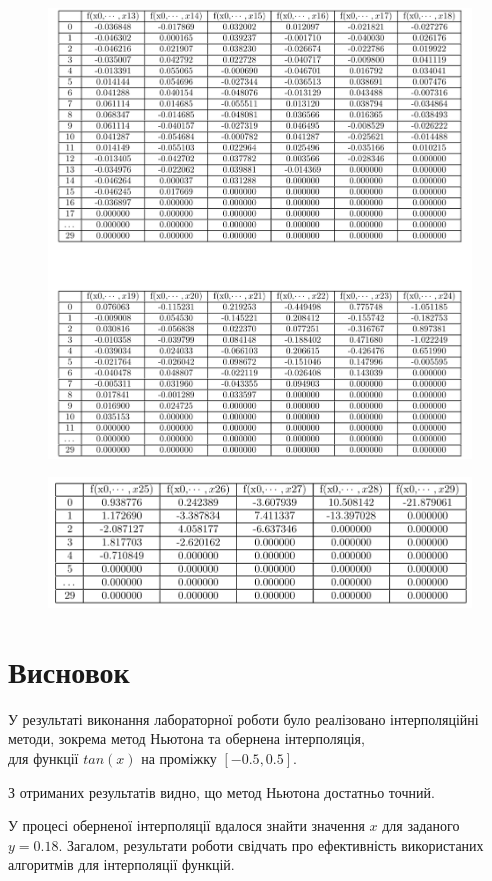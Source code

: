 \documentclass[a4paper, 12pt]{article}
\begin{document}
\begin{figure}[ht]
	\centering
	\includegraphics[width=1\linewidth]{./img/t23-4.png}
\end{figure}

\begin{figure}[ht]
	\centering
	\includegraphics[width=1\linewidth]{./img/t25.png}
\end{figure}

\clearpage
\newpage
\section{Висновок}

У результаті виконання лабораторної роботи було реалізовано інтерполяційні методи, зокрема метод Ньютона та обернена інтерполяція, \\
для функції $tan(x)$ на проміжку $[-0.5, 0.5]$. 

З отриманих результатів видно, що метод Ньютона достатньо точний.

У процесі оберненої інтерполяції вдалося знайти значення $x$ для заданого $y=0.18$.
Загалом, результати роботи свідчать про ефективність використаних алгоритмів для інтерполяції функцій.
\end{document}
